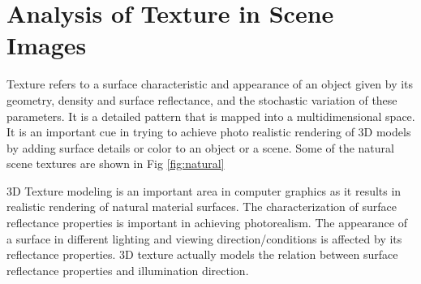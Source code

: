 \label{sec:intro}
\section{Analysis of Texture in Scene Images}

Texture refers to a surface characteristic and appearance of an object given by
its geometry, density and surface reflectance, and the stochastic variation of
these parameters.
It is a detailed pattern that is mapped into a multidimensional space.
It is an important cue in trying to achieve photo realistic
rendering of 3D models by adding surface details or color to an object or a
scene. Some of the natural scene textures are shown in Fig \ref{fig:natural}

3D Texture modeling is an important area in computer graphics as it results in realistic rendering
of natural material surfaces. The characterization of surface reflectance properties is important in
achieving photorealism. The appearance of a surface in different lighting and viewing direction/conditions 
is affected by its reflectance properties. 3D texture actually models the relation
between surface reflectance properties and illumination direction.

